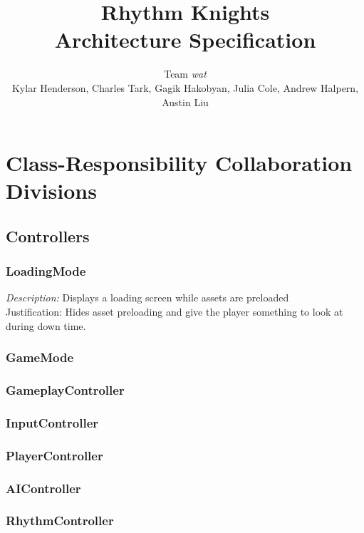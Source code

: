 \documentclass[]{article}
\renewcommand{\em}{\emph}
\begin{document}
\title{\textbf{Rhythm Knights} \\ Architecture Specification}
\author{Team \emph{wat} \\
  \small{Kylar Henderson, Charles Tark, 
    Gagik Hakobyan, Julia Cole, Andrew Halpern, Austin Liu}}
\date{} %
\maketitle

\section*{Class-Responsibility Collaboration Divisions}

\subsection*{Controllers}
\subsubsection*{LoadingMode}
\em{Description:} Displays a loading screen while assets are preloaded \\
Justification: Hides asset preloading and give the player something 
to look at during down time.\\
\subsubsection*{GameMode}
\subsubsection*{GameplayController}
\subsubsection*{InputController}
\subsubsection*{PlayerController}
\subsubsection*{AIController}
\subsubsection*{RhythmController}
\end{document}
